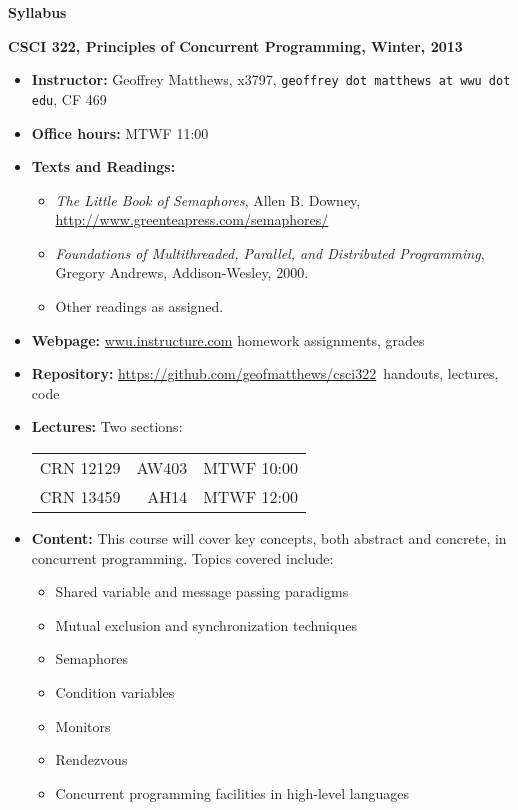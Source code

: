 \documentclass{article}
\begin{document}
\centerline{\large \bf Syllabus}

\centerline{\bf CSCI 322, Principles of Concurrent Programming, Winter, 2013}

\begin{itemize}

\item
{\bf Instructor:} Geoffrey Matthews, x3797, {\tt  geoffrey dot matthews at wwu dot edu}, CF 469
\item
{\bf Office hours:} MTWF 11:00
\item
{\bf Texts and Readings:} 
\begin{itemize}
\item {\em The Little Book of Semaphores}, Allen B. Downey, 
\url{http://www.greenteapress.com/semaphores/}
\item {\em Foundations of Multithreaded, Parallel, and Distributed Programming}, Gregory Andrews, Addison-Wesley, 2000.
\item Other readings as assigned.
\end{itemize}
\item {\bf Webpage:}  \url{wwu.instructure.com}  homework assignments, grades
\item {\bf Repository:} \url{https://github.com/geofmatthews/csci322}\  handouts, lectures, code
\item
{\bf Lectures:} Two sections:
\begin{tabular}{rrr}
CRN 12129 & AW403 & MTWF 10:00\\
CRN 13459 & AH14 & MTWF 12:00\\
\end{tabular}
\item
{\bf Content:}
This course will cover key concepts, both abstract and concrete, in
concurrent programming.  Topics covered include:
\begin{multicols}{2}
\begin{itemize}
\item Shared variable and message passing paradigms
\item Mutual exclusion and synchronization techniques
\item Semaphores 
\item Condition variables
\item Monitors 
\item Rendezvous 
\item Concurrent programming facilities in high-level languages

\end{itemize}
\end{multicols}
\end{itemize}
\end{document}
